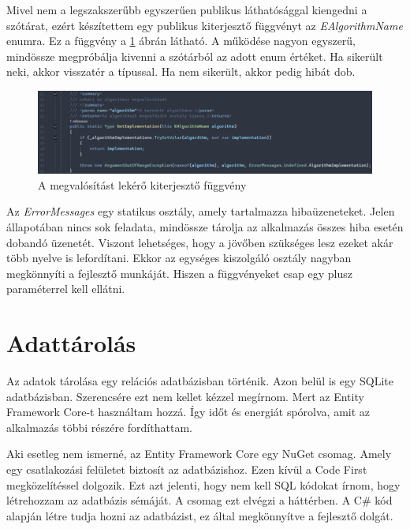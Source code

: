 \documentclass[12pt]{report} %
\begin{document}
Mivel nem a legszakszerűbb egyszerűen publikus láthatósággal kiengedni a szótárat, ezért készítettem egy publikus kiterjesztő függvényt az \textit{EAlgorithmName} enumra. Ez a függvény a \ref{fig:Implementation3} ábrán látható. A működése nagyon egyszerű, mindössze megpróbálja kivenni a szótárból az adott enum értéket. Ha sikerült neki, akkor visszatér a típussal. Ha nem sikerült, akkor pedig hibát dob.

\begin{figure}[H]
    \centering %
    \includegraphics[width=\textwidth]{Figures/Implementation3.png} %
    \caption{A megvalósítást lekérő kiterjesztő függvény} %
    \label{fig:Implementation3} %
\end{figure}

Az \textit{ErrorMessages} egy statikus osztály, amely tartalmazza hibaüzeneteket. Jelen állapotában nincs sok feladata, mindössze tárolja az alkalmazás összes hiba esetén dobandó üzenetét. Viszont lehetséges, hogy a jövőben szükséges lesz ezeket akár több nyelve is lefordítani. Ekkor az egységes kiszolgáló osztály nagyban megkönnyíti a fejlesztő munkáját. Hiszen a függvényeket csap egy plusz paraméterrel kell ellátni.

\section{Adattárolás} %

Az adatok tárolása egy relációs adatbázisban történik. Azon belül is egy SQLite adatbázisban. Szerencsére ezt nem kellet kézzel megírnom. Mert az Entity Framework Core-t \cite{entityFrameworkCore} használtam hozzá. Így időt és energiát spórolva, amit az alkalmazás többi részére fordíthattam.

Aki esetleg nem ismerné, az Entity Framework Core egy NuGet csomag. Amely egy csatlakozási felületet biztosít az adatbázishoz. Ezen kívül a Code First megközelítéssel dolgozik. Ezt azt jelenti, hogy nem kell SQL kódokat írnom, hogy létrehozzam az adatbázis sémáját. A csomag ezt elvégzi a háttérben. A C\# kód alapján létre tudja hozni az adatbázist, ez által megkönnyítve a fejlesztő dolgát.
\end{document}
